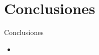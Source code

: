 \section{Conclusiones}\label{sec:conclusiones}

\begin{frame}{Conclusiones}

    \begin{itemize}
        \item

    \end{itemize}

\end{frame}